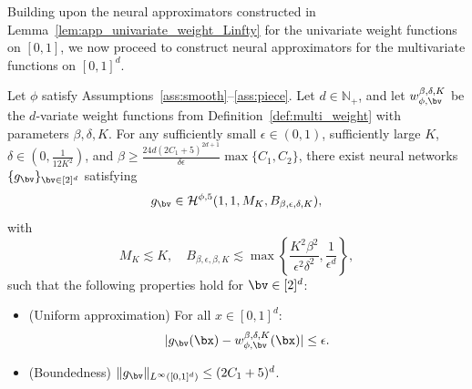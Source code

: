 \documentclass[11pt]{article}
\begin{document}
Building upon the neural approximators constructed in Lemma~\ref{lem:app_univariate_weight_Linfty} for the univariate weight functions on $[0,1]$, we now proceed to construct neural approximators for the multivariate functions on $[0,1]^d$.

\begin{lemma}
    \label{lem:app-multi-weight-global}
    Let $\phi$ satisfy Assumptions~\ref{ass:smooth}--\ref{ass:piece}. Let $d \in \mathbb{N}_{+}$, and let $w_{\phi, \bv}^{\beta, \delta, K}$ be the $d$-variate weight functions from Definition~\ref{def:multi_weight} with parameters $\beta, \delta, K$. For any sufficiently small $\epsilon \in (0,1)$, sufficiently large $K$, $\delta \in (0, \frac{1}{12K^2})$, and $\beta \geq \frac{24d(2C_1+5)^{2d+1}}{\delta \epsilon} \max\{ C_1, C_2\}$, there exist neural networks $\{g_{\bv}\}_{\bv \in [2]^d}$ satisfying
    \begin{equation*}
        g_{\bv} \in \mathcal{H}^{\phi,5}(1,1, M_K, B_{\beta, \epsilon, \delta, K}),
    \end{equation*}
    with 
    \begin{equation}
        M_{K} \lesssim K, \quad B_{\beta, \epsilon, \beta, K} \lesssim \max \left\{ \frac{K^2 \beta^2}{\epsilon^2 \delta^2}, \frac{1}{\epsilon^d}\right\},
        \label{eq:app-width-norm-phi-multi-weight}
    \end{equation}
    such that the following properties hold for  $\bv \in [2]^d$:
    \begin{itemize}
        \item (Uniform approximation) For all $x \in [0,1]^d$:
        \begin{equation*}
            |g_{\bv}(\bx) - w_{\phi,\bv}^{\beta, \delta, K}(\bx)| \leq 
            \epsilon.
        \end{equation*}
        \item (Boundedness) $\|{g}_{\bv}\|_{L^{\infty}([0,1]^d)} \leq (2C_1+5)^d$.
    \end{itemize}
\end{lemma}
\end{document}
